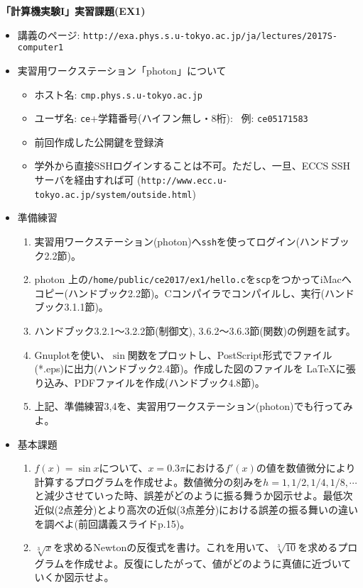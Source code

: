 \documentclass[11pt]{jarticle}
\begin{document}
\noindent
{\bf\large 「計算機実験I」実習課題(EX1)}
\\[-0.5em]

\noindent
\begin{itemize}
\item 講義のページ: \verb+http://exa.phys.s.u-tokyo.ac.jp/ja/lectures/2017S-computer1+

\item 実習用ワークステーション「photon」について
  \begin{itemize}
  \item ホスト名: {\tt cmp.phys.s.u-tokyo.ac.jp}
  \item ユーザ名: {\tt ce}+学籍番号(ハイフン無し・8桁): \ 例: {\tt ce05171583}
  \item 前回作成した公開鍵を登録済
  \item 学外から直接SSHログインすることは不可。ただし、一旦、ECCS SSHサーバを経由すれば可 (\verb+http://www.ecc.u-tokyo.ac.jp/system/outside.html+)
  \end{itemize}
  
\item 準備練習
  \begin{enumerate}
  \item 実習用ワークステーション(photon)へ{\tt ssh}を使ってログイン(ハンドブック2.2節)。
  \item photon 上の{\tt /home/public/ce2017/ex1/hello.c}を{\tt scp}をつかってiMacへコピー(ハンドブック2.2節)。Cコンパイラでコンパイルし、実行(ハンドブック3.1.1節)。
  \item ハンドブック3.2.1〜3.2.2節(制御文), 3.6.2〜3.6.3節(関数)の例題を試す。
  \item Gnuplotを使い、$\sin$関数をプロットし、PostScript形式でファイル(*.eps)に出力(ハンドブック2.4節)。作成した図のファイルを \LaTeX に張り込み、PDFファイルを作成(ハンドブック4.8節)。
  \item 上記、準備練習3,4を、実習用ワークステーション(photon)でも行ってみよ。
  \end{enumerate}

\item 基本課題
  \begin{enumerate}
  \item $f(x)=\sin x$について、$x=0.3\pi$における$f'(x)$の値を数値微分により計算するプログラムを作成せよ。数値微分の刻みを$h=1,1/2,1/4,1/8,\cdots$と減少させていった時、誤差がどのように振る舞うか図示せよ。最低次近似(2点差分)とより高次の近似(3点差分)における誤差の振る舞いの違いを調べよ(前回講義スライドp.15)。
  \item $\sqrt[3]{x}$を求めるNewtonの反復式を書け。これを用いて、$\sqrt[3]{10}$を求めるプログラムを作成せよ。反復にしたがって、値がどのように真値に近づいていくか図示せよ。
  \end{enumerate}
  

\end{itemize}
\end{document}
